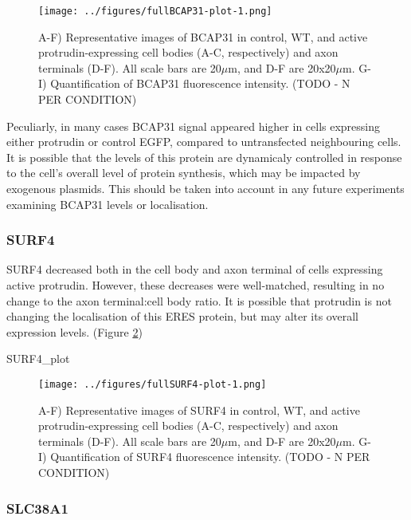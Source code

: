 \documentclass[
  12pt,
  a4paper,
]{book}
\newenvironment{Shaded}{\begin{snugshade}}{\end{snugshade}}
\newcommand{\NormalTok}[1]{#1}
\begin{document}
\begin{figure}
\centering
\texttt{[image: ../figures/fullBCAP31-plot-1.png]}
\caption{\label{fig:BCAP31-plot}A-F) Representative images of BCAP31 in control, WT, and active protrudin-expressing cell bodies (A-C, respectively) and axon terminals (D-F). All scale bars are 20\(\mu\)m, and D-F are 20x20\(\mu\)m. G-I) Quantification of BCAP31 fluorescence intensity. (TODO - N PER CONDITION)}
\end{figure}

Peculiarly, in many cases BCAP31 signal appeared higher in cells expressing either protrudin or control EGFP, compared to untransfected neighbouring cells. It is possible that the levels of this protein are dynamicaly controlled in response to the cell's overall level of protein synthesis, which may be impacted by exogenous plasmids. This should be taken into account in any future experiments examining BCAP31 levels or localisation.

\hypertarget{surf4}{%
\subsubsection{SURF4}\label{surf4}}

SURF4 decreased both in the cell body and axon terminal of cells expressing active protrudin. However, these decreases were well-matched, resulting in no change to the axon terminal:cell body ratio. It is possible that protrudin is not changing the localisation of this ERES protein, but may alter its overall expression levels. (Figure \ref{fig:SURF4-plot})

\begin{Shaded}
\begin{Highlighting}[]
\NormalTok{SURF4\_plot}
\end{Highlighting}
\end{Shaded}

\begin{figure}
\centering
\texttt{[image: ../figures/fullSURF4-plot-1.png]}
\caption{\label{fig:SURF4-plot}A-F) Representative images of SURF4 in control, WT, and active protrudin-expressing cell bodies (A-C, respectively) and axon terminals (D-F). All scale bars are 20\(\mu\)m, and D-F are 20x20\(\mu\)m. G-I) Quantification of SURF4 fluorescence intensity. (TODO - N PER CONDITION)}
\end{figure}

\hypertarget{slc38a1}{%
\subsubsection{SLC38A1}\label{slc38a1}}
\end{document}
